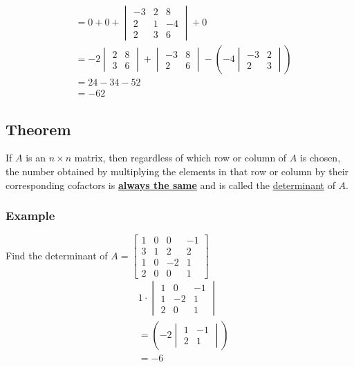 \documentclass[
  letterpaper,
  DIV=11,
  numbers=noendperiod]{scrartcl}
\begin{document}
\begin{align*}
&= 0 + 0 + \begin{vmatrix}-3 & 2 & 8 \\ 2 & 1 & -4 \\ 2 & 3 & 6\end{vmatrix}+0 \\
&= -2\begin{vmatrix}2 & 8 \\ 3 & 6 \end{vmatrix} + \begin{vmatrix}-3 & 8 \\ 2 & 6 \end{vmatrix}-\left(-4\begin{vmatrix}-3 & 2 \\ 2 & 3\end{vmatrix}\right) \\
&= 24 -34 -52 \\
&= -62
\end{align*}

\subsection{Theorem}\label{theorem}

If \(A\) is an \(n \times n\) matrix, then regardless of which row or
column of \(A\) is chosen, the number obtained by multiplying the
elements in that row or column by their corresponding cofactors is
\ul{\textbf{always the same}} and is called the \ul{determinant} of
\(A\).

\subsubsection{Example}\label{example-2}

Find the determinant of
\(A=\begin{bmatrix}1 & 0 & 0 & -1 \\ 3 & 1 & 2 & 2 \\ 1 & 0 & -2 & 1 \\ 2 & 0 & 0 & 1\end{bmatrix}\)
\begin{align*}
&1\cdot\begin{vmatrix}1 & 0 & -1 \\ 1 & -2 & 1 \\ 2 & 0 & 1 \end{vmatrix} \\
&=\left(-2\begin{vmatrix}1 & -1 \\ 2 & 1\end{vmatrix}\right) \\
&= -6
\end{align*}
\end{document}
